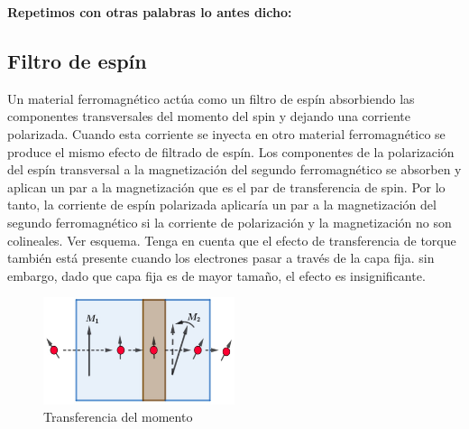 \textbf{Repetimos con otras palabras lo antes dicho:}


\subsection{Filtro de espín}

Un material ferromagnético actúa como un filtro de espín absorbiendo las componentes transversales del momento del spin y dejando una corriente polarizada. Cuando esta corriente se inyecta en otro material ferromagnético se produce el mismo efecto de filtrado de espín. Los componentes de la polarización del espín transversal a la magnetización del segundo ferromagnético se absorben y aplican un par a la magnetización que es el par de transferencia de spin. Por lo tanto, la corriente de espín polarizada aplicaría un par a la magnetización del segundo ferromagnético si la corriente de polarización y la magnetización no son colineales. Ver esquema. Tenga en cuenta que el efecto de transferencia de torque también está presente cuando los electrones pasar a través de la capa fija. sin embargo, dado que capa fija es de mayor tamaño, el efecto es insignificante.

\begin{figure}[H]
    \centering
    \includegraphics[width=0.5\textwidth]{./Figures/fig41}
	\caption{Transferencia del momento}
	\label{fig:41}
\end{figure}

